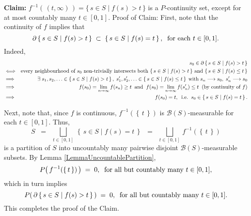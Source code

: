 	\begin{center}
	\vskip 0.3cm
	\begin{minipage}{6.5in}
	\noindent
	\textbf{Claim:}
	\vskip 0.1cm
	\noindent
	$f^{-1}\!\left(\,(t,\infty)\,\right) = \{\,s\in S \;\vert\; f(s) > t\,\}$ is a $P$-continuity set,
	except for at most countably many $t \in [0,1]$.
	\vskip 0.2cm
	\noindent
	Proof of Claim:\;\;
	First, note that the continuity of $f$ implies that
	\begin{equation*}
	\partial\left\{\,s \in S \;\vert\; f(s) > t\,\right\} \;\subset\; \left\{\,s \in S \;\vert\; f(s) = t\,\right\},
	\;\;\textnormal{for each $t \in [0,1]$}.
	\end{equation*}
	Indeed,
	\begin{eqnarray*}
	&&
		s_{0} \in \partial\left\{\,s \in S \;\vert\; f(s) > t\,\right\}
	\\	
	&\Longleftrightarrow&
		\textnormal{every neighbourhood of $s_{0}$ non-trivially intersects both
		$\left\{\,s \in S \;\vert\; f(s) > t\,\right\}$ and $\left\{\,s \in S \;\vert\; f(s) \leq t\,\right\}$}
	\\
	&\Longrightarrow&
		\exists\;s_{1},s_{2},\ldots\in\left\{\,s \in S \;\vert\; f(s) > t\,\right\},
		\;s'_{1},s'_{2},\ldots\in\left\{\,s \in S \;\vert\; f(s) \leq t\,\right\}
		\;\textnormal{with}\; s_{n}\longrightarrow s_{0},\; s'_{n}\longrightarrow s_{0}
	\\
	&\Longrightarrow&
		f(s_{0}) = \lim_{n\rightarrow\infty}f(s_{n}) \geq t
		\;\;\textnormal{and}\;\;
		f(s_{0}) = \lim_{n\rightarrow\infty}f(s'_{n}) \leq t
		\;\;\textnormal{(by continuity of $f$)}
	\\
	&\Longrightarrow&
		f(s_{0}) = t,
		\;\;\textnormal{i.e.}\;\;
		s_{0} \in \left\{\,s \in S \;\vert\; f(s) = t\,\right\}.
	\end{eqnarray*}
	\end{minipage}
	\end{center}
	\begin{center}
	\begin{minipage}{6.5in}
	\noindent
	Next, note that, since $f$ is continuous,
	$f^{-1}\!\left(\left\{\,t\,\right\}\right)$ is $\mathcal{B}(S)$-measurable for each $t \in [0,1]$.
	Thus,
	\begin{equation*}
	S \;\; = \;\; \bigsqcup_{t \in [0,1]}\,\left\{\,s\in S \;\vert\; f(s) = t\,\right\}
	\;\; = \;\; \bigsqcup_{t \in [0,1]}\, f^{-1}\!\left(\left\{\,t\,\right\}\right)
	\end{equation*}
	is a partition of $S$ into uncountably many pairwise disjoint $\mathcal{B}(S)$-measurable subsets.
	By Lemma \ref{LemmaUncountablePartition},
	\begin{equation*}
	P\!\left(\,f^{-1}\!\left(\left\{\,t\,\right\}\right)\,\right) \; = \; 0,
	\;\;\textnormal{for all but countably many $t \in [0,1]$},
	\end{equation*}
	which in turn implies
	\begin{equation*}
	P\!\left(\,\partial\left\{\,s\in S\;\vert\;f(s) > t\,\right\}\,\right) \; = \; 0,
	\;\;\textnormal{for all but countably many $t \in [0,1]$}.
	\end{equation*}
	This completes the proof of the Claim.
	\end{minipage}
	\end{center}

